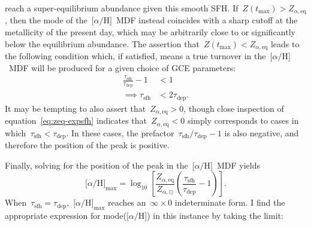 \documentclass[12pt]{article}
\newcommand{\ah}{\ensuremath{\text{[$\alpha$/H]}}}
\newcommand{\timescale}[1]{\ensuremath{\tau_\text{#1}}}
\begin{document}
reach a super-equilibrium abundance given this smooth SFH.
If~$Z(t_\text{max}) > Z_{\alpha,\text{eq}}$, then the mode of the~\ah~MDF
instead coincides with a sharp cutoff at the metallicity of the present day,
which may be arbitrarily close to or significantly below the equilibrium
abundance.
The assertion that~$Z(t_\text{max}) < Z_{\alpha,\text{eq}}$ leads to the
following condition which, if satisfied, means a true turnover in the~\ah~MDF
will be produced for a given choice of GCE parameters:
\begin{subequations}\begin{align}
\frac{\timescale{sfh}}{\timescale{dep}} - 1 &< 1
\\
\implies \timescale{sfh} &< 2\timescale{dep}.
\label{eq:mode-ah-expsfh-criterion}
\end{align}\end{subequations}
It may be tempting to also assert that~$Z_{\alpha,\text{eq}} > 0$, though close
inspection of equation~\ref{eq:zeq-expsfh} indicates
that~$Z_{\alpha,\text{eq}} < 0$ simply corresponds to cases in
which~$\timescale{sfh} < \timescale{dep}$.
In these cases, the prefactor~$\timescale{sfh} / \timescale{dep} - 1$ is also
negative, and therefore the position of the peak is positive.
\par
Finally, solving for the position of the peak in the~\ah~MDF yields
\begin{equation}
\ah_\text{max} = \log_{10}\left[
\frac{Z_{\alpha,\text{eq}}}{Z_{\alpha,\odot}}
\left(\frac{\timescale{sfh}}{\timescale{dep}} - 1\right)
\right].
\label{eq:mode-ah-expsfh}
\end{equation}
When~$\timescale{sfh} = \timescale{dep}$,~$\ah_\text{max}$ reaches
an~$\infty \times 0$ indeterminate form.
I find the appropriate expression for mode(\ah) in this instance by taking
the limit:
\end{document}
